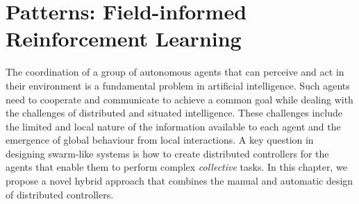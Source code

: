 %

%
\chapter[Patterns: Field-informed Reinforcement Learning]{Patterns: Field-informed Reinforcement Learning}\label{chap:rl:field-informed}%
\minitoc%

\newcommand{\ga}[1]{\meta{red}{GA}{#1}}
\newcommand{\lukas}[1]{\meta{purple}{Lukas}{#1}}
\newcommand{\mv}[1]{\meta{green}{MV}{#1}}
\newcommand{\review}[1]{{#1}}
The coordination of a group of autonomous agents that can perceive and act in their environment is a fundamental problem in artificial intelligence. 
Such agents need to cooperate and communicate to achieve a common goal 
 while dealing with the challenges of distributed and situated intelligence. 
 These challenges include the limited and local nature of the information available to each agent and the emergence of global behaviour from local interactions. 
%
A key question in designing swarm-like systems is how to create distributed controllers for the agents that enable them to perform complex \emph{collective} tasks. 
%
In this chapter, we propose a novel hybrid approach that combines the manual and automatic design of distributed controllers.

